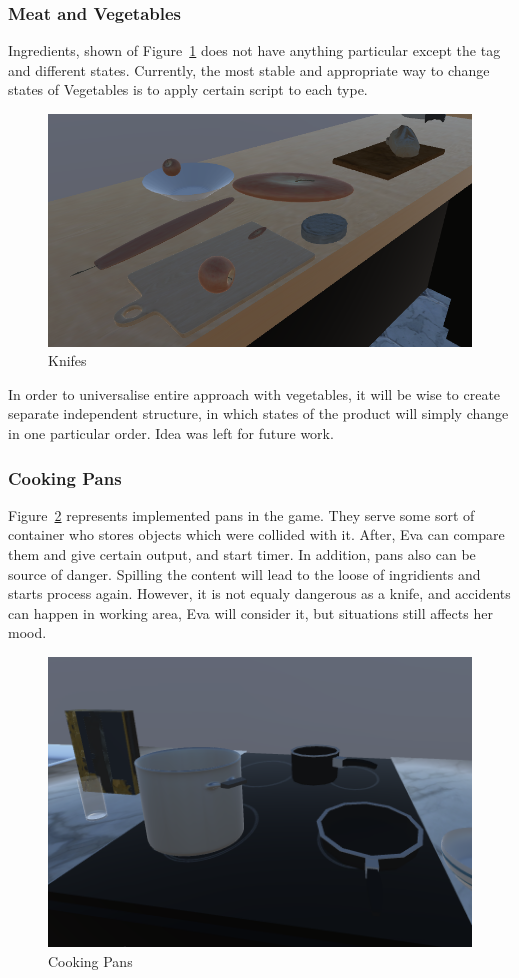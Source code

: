 \documentclass[18pt]{article}
\numberwithin{equation}{section} %
\numberwithin{figure}{section} %
\numberwithin{table}{section} %
\begin{document}
		\subsubsection{Meat and Vegetables}
			Ingredients, shown of Figure~\ref{fig:food} does not have anything particular except the tag and different states. Currently, the most stable and appropriate way to change states of Vegetables is to apply certain script to each type. \\
				\begin{figure}[H]
					\centering
					\includegraphics[width=0.5\linewidth]{images/food}
					\caption{Knifes}
					\label{fig:food}
				\end{figure}
			In order to universalise entire approach with vegetables, it will be wise to create separate independent structure, in which states of the product will simply change in one particular order. Idea was left for future work. \\
		\subsubsection{Cooking Pans}
			Figure~\ref{fig:pans} represents implemented pans in the game. They serve some sort of container who stores objects which were collided with it. After, Eva can compare them and give certain output, and start timer. In addition, pans also can be source of danger. Spilling the content will lead to the loose of ingridients and starts process again. However, it is not equaly dangerous as a knife, and accidents can happen in working area, Eva will consider it, but situations still affects her mood.
			\begin{figure}[H]
				\centering
				\includegraphics[width=0.5\linewidth]{images/pans}
				\caption{Cooking Pans}
				\label{fig:pans}
			\end{figure}
		
\end{document}
